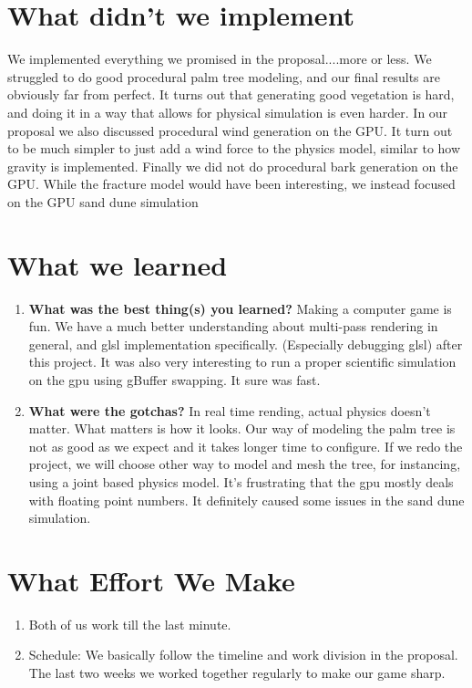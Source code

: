 \documentclass[annual]{acmsiggraph}
\begin{document}
\section{What didn't we implement}
We implemented everything we promised in the proposal....more or less.   We struggled to do good procedural palm tree modeling, and our final results are obviously far from perfect.    It turns out that generating good vegetation is hard, and doing it in a way that allows for physical simulation is even harder.  In our proposal we also discussed procedural wind generation on the GPU.  It turn out to be much simpler to just add a wind force to the physics model,  similar to how gravity is implemented.  Finally we did not do procedural bark generation on the GPU.  While the fracture model would have been interesting, we instead focused on the GPU sand dune simulation  

\section{What we learned}
\begin{enumerate}
\item{\textbf{What was the best thing(s) you learned?} Making a computer game is fun. We have a much better understanding about multi-pass rendering in general, and glsl implementation specifically.   (Especially debugging glsl) after this project.  It was also very interesting to run a proper scientific simulation on the gpu using gBuffer swapping.  It sure was fast.}

\item{\textbf{What were the gotchas?} In real time rending, actual physics doesn't matter. What matters is how it looks. Our way of modeling the palm tree is not as good as we expect and it takes longer time to configure. If we redo the project, we will choose other way to model and mesh the tree, for instancing, using a joint based physics model.  It's frustrating that the gpu mostly deals with floating point numbers.  It definitely caused some issues in the sand dune simulation. }
\end{enumerate}

\section{What Effort We Make}
\begin{enumerate}
\item{Both of us work till the last minute.}
\item{Schedule}: We basically follow the timeline and work division in the proposal. The last two weeks we worked together regularly to make our game sharp. 
\end{enumerate}
\end{document}
